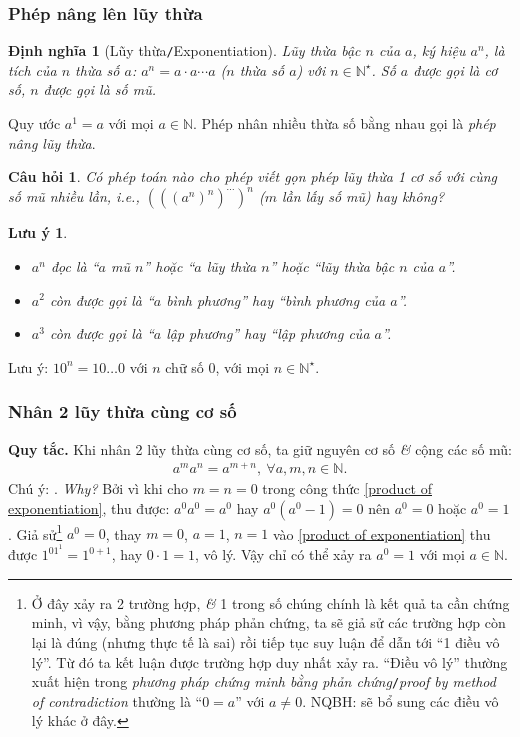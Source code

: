 \documentclass{article}
\numberwithin{equation}{section}
\newtheorem{definition}{Định nghĩa}[section]
\newtheorem{remark}{Lưu ý}[section]
\newtheorem{question}{Câu hỏi}[section]
\begin{document}
\subsubsection{Phép nâng lên lũy thừa}

\begin{definition}[Lũy thừa\texttt{/}Exponentiation]
	\emph{Lũy thừa bậc $n$} của $a$, ký hiệu $a^n$, là tích của $n$ thừa số $a$: $a^n = a\cdot a\cdots a$ ($n$ thừa số $a$) với $n\in\mathbb{N}^\star$. Số $a$ được gọi là \emph{cơ số}, $n$ được gọi là \emph{số mũ}.
\end{definition}
Quy ước $a^1 = a$ với mọi $a\in\mathbb{N}$. Phép nhân nhiều thừa số bằng nhau gọi là \textit{phép nâng lũy thừa}.

\begin{question}
	Có phép toán nào cho phép viết gọn phép lũy thừa 1 cơ số với cùng số mũ nhiều lần, i.e., $(((a^n)^n)^{\cdots})^n$ ($m$ lần lấy số mũ) hay không?
\end{question}

\begin{remark}
	\begin{itemize}
		\item $a^n$ đọc là ``$a$ mũ $n$'' hoặc ``$a$ lũy thừa $n$'' hoặc ``lũy thừa bậc $n$ của $a$''.
		\item $a^2$ còn được gọi là ``$a$ bình phương'' hay ``bình phương của $a$''.
		\item $a^3$ còn được gọi là ``$a$ lập phương'' hay ``lập phương của $a$''.
	\end{itemize}
\end{remark}
Lưu ý: $10^n = 10\ldots 0$ với $n$ chữ số 0, với mọi $n\in\mathbb{N}^\star$.

\subsubsection{Nhân 2 lũy thừa cùng cơ số}
\textbf{Quy tắc.} Khi nhân 2 lũy thừa cùng cơ số, ta giữ nguyên cơ số \textit{\&} cộng các số mũ:
\begin{align}
	\label{product of exponentiation}
	\boxed{a^ma^n = a^{m+n},\ \forall a,m,n\in\mathbb{N}.}
\end{align}
Chú ý: . \textit{Why?} Bởi vì khi cho $m = n = 0$ trong công thức \eqref{product of exponentiation}, thu được: $a^0a^0 = a^0$ hay $a^0(a^0 - 1) = 0$ nên $a^0 = 0$ hoặc $a^0 = 1$. Giả sử\footnote{Ở đây xảy ra 2 trường hợp, \textit{\&} 1 trong số chúng chính là kết quả ta cần chứng minh, vì vậy, bằng phương pháp phản chứng, ta sẽ giả sử các trường hợp còn lại là đúng (nhưng thực tế là sai) rồi tiếp tục suy luận để dẫn tới ``1 điều vô lý''. Từ đó ta kết luận được trường hợp duy nhất xảy ra. ``Điều vô lý'' thường xuất hiện trong \textit{phương pháp chứng minh bằng phản chứng}\texttt{/}\textit{proof by method of contradiction} thường là ``$0 = a$'' với $a\ne 0$. NQBH: sẽ bổ sung các điều vô lý khác ở đây.} $a^0 = 0$, thay $m = 0$, $a = 1$, $n = 1$ vào \eqref{product of exponentiation} thu được $1^01^1 = 1^{0+1}$, hay $0\cdot 1 = 1$, vô lý. Vậy chỉ có thể xảy ra $a^0 = 1$ với mọi $a\in\mathbb{N}$.
\end{document}
